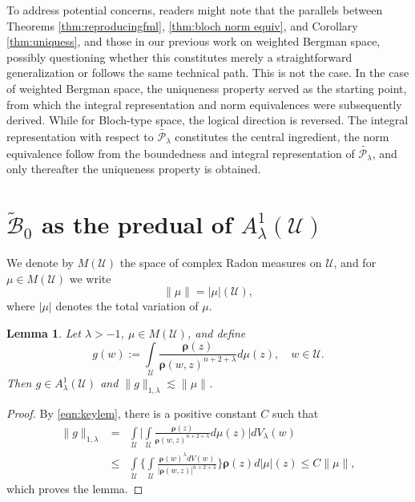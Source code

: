 \documentclass{amsart}
\newtheorem{lemma}[theorem]{Lemma}
\numberwithin{equation}{section}
\newcommand{\calU}{\mathcal{U}}
\newcommand{\bfrho}{\boldsymbol{\rho}}
\newcommand{\calB}{\mathcal{B}}
\begin{document}
To address potential concerns, readers might note that the parallels between Theorems \ref{thm:reproducingfml}, \ref{thm:bloch norm equiv}, and Corollary \ref{thm:uniquess}, and those in our previous work \cite{LSX22} on weighted Bergman space, possibly questioning whether this constitutes merely a straightforward generalization or follows the same technical path.
This is not the case.
In the case of weighted Bergman space, the uniqueness property served as the starting point, from which the integral representation and norm equivalences were subsequently derived.
While for Bloch-type space, the logical direction is reversed. The integral representation with respect to $\widetilde{\mathcal{P}_{\lambda}}$ constitutes the central ingredient, the norm equivalence follow from the boundedness and integral representation of $\widetilde{\mathcal{P}_{\lambda}}$, and only thereafter the uniqueness property is obtained.




\section{$\widetilde{\calB}_0$ as the predual of $A_{\lambda}^1(\calU)$}

We denote by $M(\calU)$ the space of complex Radon measures on $\calU$, and for $\mu\in M(\calU)$ we write
\[
\|\mu\|=|\mu|(\calU),
\]
where $|\mu|$ denotes the total variation of $\mu$.

\begin{lemma}\label{lem:mu}
Let $\lambda>-1$, $\mu\in M(\calU)$, and define
\[
g(w):=\int\limits_{\calU} \frac{\bfrho(z)}{\bfrho(w,z)^{n+2+\lambda}} d\mu(z), \quad w\in \calU.
\]
Then $g\in A_\lambda^1(\calU)$ and $\|g\|_{1,\lambda}\lesssim \|\mu\|$.
\end{lemma}
\begin{proof}
By \eqref{eqn:keylem}, there is a positive constant $C$ such that
\begin{eqnarray*}
\|g\|_{1,\lambda} &=& \int\limits_{\calU}\bigg|\int\limits_{\calU} \frac {\bfrho(z)}{\bfrho(w,z)^{n+2+\lambda}} d\mu(z)\bigg| dV_\lambda(w)\\
&\leq& \int\limits_{\calU} \bigg\{\int\limits_{\calU} \frac {\bfrho(w)^\lambda dV(w)}{|\bfrho(w,z)|^{n+2+\lambda}} \bigg\} \bfrho(z) d|\mu|(z)
\leq C\|\mu\|,
\end{eqnarray*}
which proves the lemma.
\end{proof}
\end{document}
